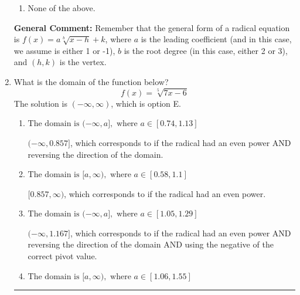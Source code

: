 \documentclass{extbook}[14pt]
\newcommand{\litem}[1]{\item #1

\rule{\textwidth}{0.4pt}}
\begin{document}
\begin{enumerate}
{\begin{enumerate}[label=\Alph*.]
\item None of the above.\end{enumerate}
\textbf{General Comment:} Remember that the general form of a radical equation is $ f(x) = a \sqrt[b]{x - h} + k $, where $a$ is the leading coefficient (and in this case, we assume is either 1 or -1), $b$ is the root degree (in this case, either 2 or 3), and $(h, k)$ is the vertex.
}
\litem{
What is the domain of the function below?
\[ f(x) = \sqrt[5]{7 x - 6} \]The solution is \( (-\infty, \infty) \), which is option E.\begin{enumerate}[label=\Alph*.]
\item \( \text{The domain is } (-\infty, a], \text{   where } a \in [0.74, 1.13] \)

$(-\infty, 0.857]$, which corresponds to if the radical had an even power AND reversing the direction of the domain.
\item \( \text{The domain is } [a, \infty), \text{   where } a \in [0.58, 1.1] \)

$[0.857, \infty)$, which corresponds to if the radical had an even power.
\item \( \text{The domain is } (-\infty, a], \text{   where } a \in [1.05, 1.29] \)

$(-\infty, 1.167]$, which corresponds to if the radical had an even power AND reversing the direction of the domain AND using the negative of the correct pivot value.
\item \( \text{The domain is } [a, \infty), \text{   where } a \in [1.06, 1.55] \)


\end{enumerate}}
\end{enumerate}
\end{document}
